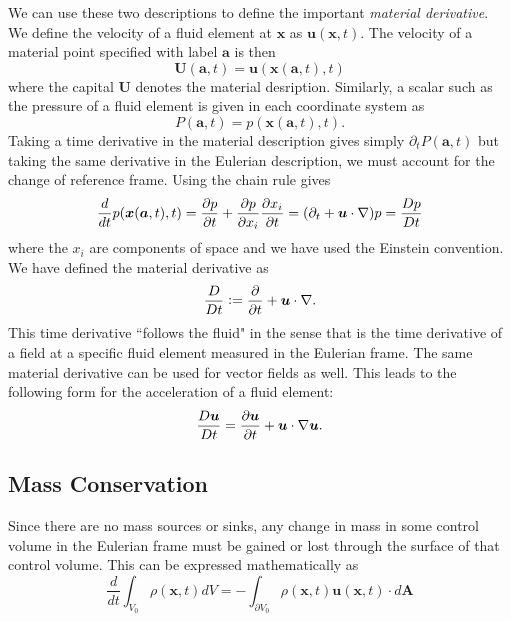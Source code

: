 We can use these two descriptions to define the important \textit{material derivative}. We define the velocity of a fluid element at $\bm{x}$ as $\bm{u}(\bm{x},t)$. The velocity of a material point specified with label $\bm{a}$ is then
\begin{equation}
\bm{U}(\bm{a},t) = \bm{u}(\bm{x}(\bm{a},t),t)
\end{equation}
where the capital $\bm{U}$ denotes the material desription. Similarly, a scalar such as the pressure of a fluid element is given in each coordinate system as
\begin{equation}
P(\bm{a},t) = p(\bm{x}(\bm{a},t),t).
\end{equation}
Taking a time derivative in the material description gives simply $\partial_t P(\bm{a},t)$ but taking the same derivative in the Eulerian description, we must account for the change of reference frame. Using the chain rule gives
\begin{equation}
\frac{d}{dt}p(\bm{x}(\bm{a},t),t) = \frac{\partial p}{\partial t} + \frac{\partial p}{\partial x_i} \frac{\partial x_i}{\partial t} = (\partial_t + \bm{u} \cdot \nabla) p = \frac{Dp}{Dt}
\end{equation}
where the $x_i$ are components of space and we have used the Einstein convention. We have defined the material derivative as
\begin{equation}
\frac{D}{Dt} \vcentcolon= \frac{\partial }{\partial t} + \bm{u} \cdot \nabla.
\end{equation}
This time derivative ``follows the fluid" in the sense that is the time derivative of a field at a specific fluid element measured in the Eulerian frame. The same material derivative can be used for vector fields as well. This leads to the following form for the acceleration of a fluid element:
\begin{equation}
\frac{D\bm{u}}{Dt} = \frac{\partial \bm{u}}{\partial t} + \bm{u} \cdot \nabla\bm{u}.
\end{equation} 
\subsection{Mass Conservation}
Since there are no mass sources or sinks, any change in mass in some control volume in the Eulerian frame must be gained or lost through the surface of that control volume. This can be expressed mathematically as
\begin{equation}
\frac{d}{dt}\int_{V_0} \rho(\bm{x},t)dV = -\int_{\partial V_0} \rho(\bm{x},t)\bm{u}(\bm{x},t) \cdot d\bm{A}
\end{equation}



